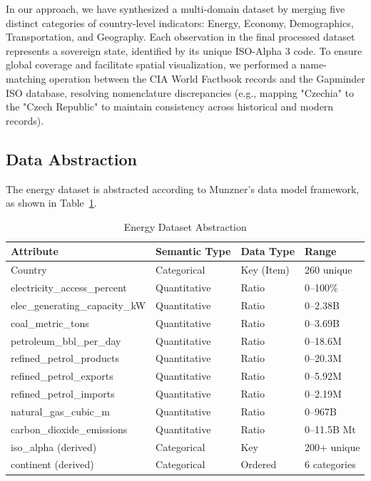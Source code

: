 \documentclass[conference]{IEEEtran}
\begin{document}
In our approach, we have synthesized a multi-domain dataset by merging five distinct categories of country-level indicators: Energy, Economy, Demographics, Transportation, and Geography. Each observation in the final processed dataset represents a sovereign state, identified by its unique ISO-Alpha 3 code. To ensure global coverage and facilitate spatial visualization, we performed a name-matching operation between the CIA World Factbook records and the Gapminder ISO database, resolving nomenclature discrepancies (e.g., mapping "Czechia" to the "Czech Republic" to maintain consistency across historical and modern records).

\subsection{Data Abstraction}
The energy dataset is abstracted according to Munzner's data model framework, as shown in Table~\ref{tab:data_abstraction}.

\begin{table}[H]
\centering
\caption{Energy Dataset Abstraction}
\label{tab:data_abstraction}
\small
\begin{tabular}{|p{3.5cm}|p{1.4cm}|p{0.8cm}|p{1.4cm}|}
\hline
\textbf{Attribute} & \textbf{Semantic Type} & \textbf{Data Type} & \textbf{Range} \\
\hline
Country & Categorical & Key (Item) & 260 unique \\
electricity\_access\_percent & Quantitative & Ratio & 0--100\% \\
elec\_generating\_capacity\_kW & Quantitative & Ratio & 0--2.38B \\
coal\_metric\_tons & Quantitative & Ratio & 0--3.69B \\
petroleum\_bbl\_per\_day & Quantitative & Ratio & 0--18.6M \\
refined\_petrol\_products & Quantitative & Ratio & 0--20.3M \\
refined\_petrol\_exports & Quantitative & Ratio & 0--5.92M \\
refined\_petrol\_imports & Quantitative & Ratio & 0--2.19M \\
natural\_gas\_cubic\_m & Quantitative & Ratio & 0--967B \\
carbon\_dioxide\_emissions & Quantitative & Ratio & 0--11.5B Mt \\
iso\_alpha (derived) & Categorical & Key & 200+ unique \\
continent (derived) & Categorical & Ordered & 6 categories \\
\hline
\end{tabular}
\end{table}
\end{document}
